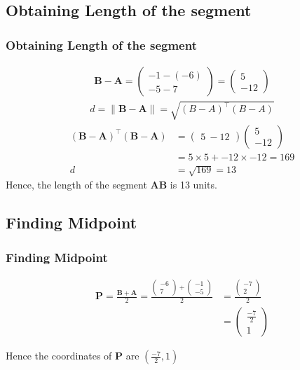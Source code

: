 \documentclass{beamer}
\providecommand{\brak}[1]{\ensuremath{\left(#1\right)}}
\theoremstyle{remark}
\newcommand{\myvec}[1]{\ensuremath{\begin{pmatrix}#1\end{pmatrix}}}
\let\vec\mathbf
\numberwithin{equation}{section}
\begin{document}
\subsection{Obtaining Length of the segment}
\begin{frame}
\frametitle{Obtaining Length of the segment}
    \begin{align}
\vec{B} - \vec{A} = \myvec{-1 - (-6) \\ -5 - 7} = \myvec{5 \\ -12}  
\end{align}
\begin{align}
d = \|\vec{B-A}\| = \sqrt{\brak{B-A}^\top \brak{B-A}} 
\end{align}
\begin{align}
\brak{\vec{B}-\vec{A}}^\top \brak{\vec{B}-\vec{A}}&=\myvec{5  \ -12}\myvec{5 \\ -12}\\
&=5\times5+-12\times-12 = 169\\
d &=\sqrt{169}=13
\end{align}
Hence, the length of the segment $\vec{AB}$ is 13 units.
\end{frame}
\subsection{Finding Midpoint}
\begin{frame}
\frametitle{Finding Midpoint}

\begin{align}
\vec{P}=\frac{\vec{B}+\vec{A}}{2}=\frac{\myvec{-6\\7}+\myvec{-1\\-5}}{2}&=\frac{\myvec{-7\\2}}{2}\\ &=\myvec{\frac{-7}{2}\\1}
\end{align}

Hence the coordinates of $\vec{P}$ are $\brak{\frac{-7}{2},1}$



\end{frame}
\end{document}

